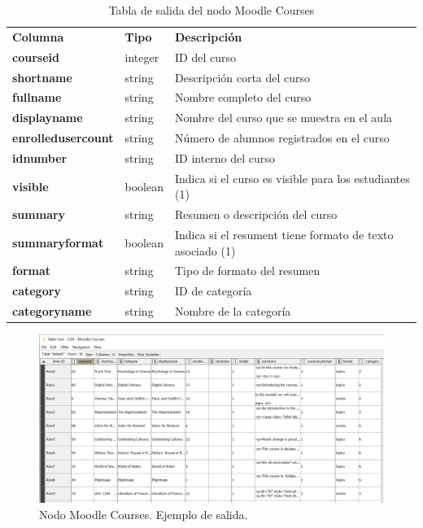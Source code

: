 \begin{table}[!h]
	\begin{center}
		\begin{tabular}{p{}p{}p{}}
			\toprule
			\textbf{Columna} & \textbf{Tipo} & \textbf{Descripción}\\
			\otoprule
			\textbf{courseid} & integer & ID del curso \\
         \hline
			\textbf{shortname} & string & Descripción corta del curso \\
         \hline
         \textbf{fullname} & string & Nombre completo del curso \\
         \hline
         \textbf{displayname} & string & Nombre del curso que se muestra en el aula \\
         \hline
         \textbf{enrolledusercount} & string & Número de alumnos registrados en el curso \\
         \hline
         \textbf{idnumber} & string & ID interno del curso \\
         \hline
         \textbf{visible} & boolean & Indica si el curso es visible para los estudiantes (1) \\
         \hline
         \textbf{summary} & string & Resumen o descripción del curso\\
         \hline
         \textbf{summaryformat} & boolean & Indica si el resument tiene formato de texto asociado (1) \\
         \hline
         \textbf{format} & string & Tipo de formato del resumen \\
         \hline
         \textbf{category} & string & ID de categoría \\
         \hline
         \textbf{categoryname} & string & Nombre de la categoría \\
			\bottomrule
		\end{tabular}
	\end{center}
	\caption{Tabla de salida del nodo Moodle Courses}
	\label{tab:moodle_courses_desc}
\end{table}
\FloatBarrier


\begin{figure}[!h]
	\centering
	\includegraphics[width=1\textwidth]{img/nodes_moodle_courses_output.png}
	\caption{Nodo Moodle Courses. Ejemplo de salida.}
	\label{fig:moodlecourses_output}
\end{figure}
\FloatBarrier
\hphantom{ }


